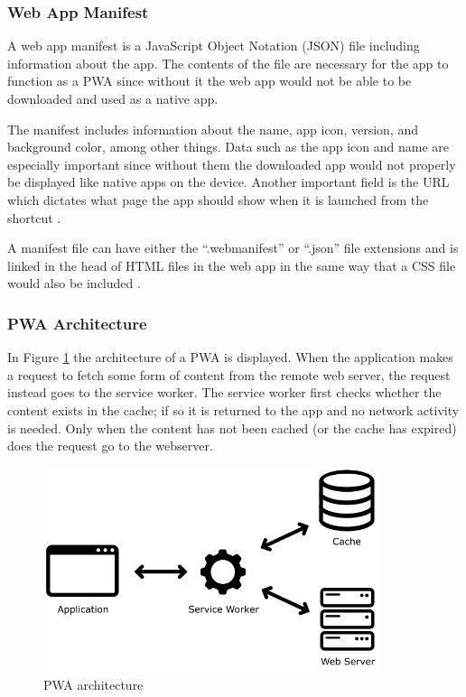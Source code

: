\documentclass[a4paper,12pt]{article}
\begin{document}
\subsubsection{Web App Manifest}
\label{Theory_PWA_webManifest}
A web app manifest is a JavaScript Object Notation (JSON) file including information about the app. The contents of the file are necessary for the app to function as a PWA since without it the web app would not be able to be downloaded and used as a native app.

The manifest includes information about the name, app icon, version, and background color, among other things. Data such as the app icon and name are especially important since without them the downloaded app would not properly be displayed like native apps on the device. Another important field is the URL which dictates what page the app should show when it is launched from the shortcut \cite{mozilla_webmanifest}.

A manifest file can have either the “.webmanifest” or “.json” file extensions and is linked in the head of HTML files in the web app in the same way that a CSS file would also be included \cite{mozilla_webmanifest}.

\subsubsection{PWA Architecture}
\label{Theory_PWA_architecture}
In Figure \ref{fig:pwaapp} the architecture of a PWA is displayed. When the application makes a request to fetch some form of content from the remote web server, the request instead goes to the service worker. The service worker first checks whether the content exists in the cache; if so it is returned to the app and no network activity is needed. Only when the content has not been cached (or the cache has expired) does the request go to the webserver.

\begin{figure}[h]%
	\centering
	\includegraphics[height=6cm]{img/Other/struct_pwa.png}
	\caption{PWA architecture}%
	\label{fig:pwaapp}%
\end{figure}
\end{document}
